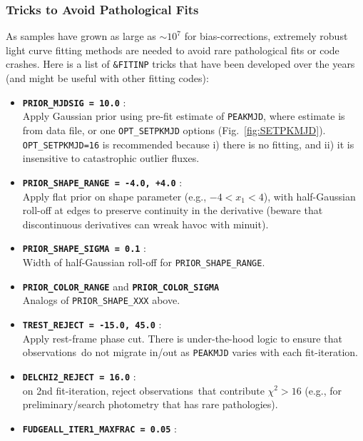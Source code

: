 \documentclass[12pt]{article}
\newcommand{\obss}{observations}
\newcommand{\minuit}{{\sc minuit}}
\begin{document}
\subsubsection{Tricks to Avoid Pathological Fits}
\label{sss:lcfit_tricks}

As samples have grown as large as $\sim 10^7$ for bias-corrections,
extremely robust light curve fitting methods are needed to avoid
rare pathological fits or code crashes. Here is a list of 
{\tt \&FITINP} tricks that have been developed over the years
(and might be useful with other fitting codes):
\begin{itemize}
   \item {\bf\tt PRIOR\_MJDSIG = 10.0} : \\
      Apply Gaussian prior using pre-fit estimate of {\tt PEAKMJD},
      where estimate is from data file, or one {\tt OPT\_SETPKMJD}
      options (Fig.~\ref{fig:SETPKMJD}). 
      {\tt OPT\_SETPKMJD=16} is recommended because i) there is no
      fitting, and ii) it is insensitive to catastrophic outlier fluxes.
%
   \item {\bf\tt PRIOR\_SHAPE\_RANGE = -4.0, +4.0} : \\
      Apply flat prior on shape parameter (e.g., $-4<x_1<4$),
      with half-Gaussian roll-off at edges to preserve continuity
      in the derivative (beware that discontinuous derivatives
      can wreak havoc with {\minuit}).
%
   \item {\bf\tt PRIOR\_SHAPE\_SIGMA = 0.1} : \\
      Width of half-Gaussian roll-off for {\tt PRIOR\_SHAPE\_RANGE}.
%
  \item {\bf\tt PRIOR\_COLOR\_RANGE} and {\bf\tt PRIOR\_COLOR\_SIGMA} \\
     Analogs of {\tt PRIOR\_SHAPE\_XXX} above.
%
  \item {\bf\tt TREST\_REJECT = -15.0, 45.0} : \\
     Apply rest-frame phase cut. There is under-the-hood logic to ensure
     that \obss\ do not migrate in/out as {\tt PEAKMJD} varies with
     each fit-iteration.
%
   \item {\bf\tt DELCHI2\_REJECT = 16.0} : \\
      on 2nd fit-iteration, reject \obss\ that contribute $\chi^2 > 16$ 
      (e.g., for preliminary/search photometry that has rare pathologies).
%      
  \item {\bf\tt FUDGEALL\_ITER1\_MAXFRAC = 0.05} : \\

\end{itemize}
\end{document}

